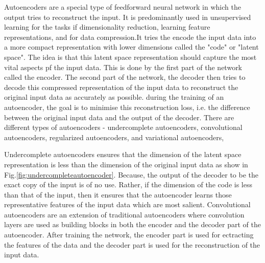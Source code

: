 Autoencoders are a special type of feedforward neural network in which the output tries to reconstruct the input. It is predominantly used in unsupervised learning for the tasks if dimensionality reduction, learning feature representations, and for data compression.It tries the encode the input data into a more compact representation with lower dimensions called the "code"\cite*{Goodfellow-et-al-2016} or "latent space". The idea is that this latent space representation should capture the most vital aspects pf the input data. This is done by the first part of the network called the encoder. The second part of the network, the decoder then tries to decode this compressed representation of the input data to reconstruct the original input data as accurately as possible. during the training of an autoencoder, the goal is to minimise this reconstruction loss, i.e. the difference between the original input data and the output of the decoder. There are different types of autoencoders - undercomplete autoencoders, convolutional autoencoders, regularized autoencoders, and variational autoencoders,

\vspace{5mm}


Undercomplete autoencoders ensures that the dimension of the latent space representation is less than the dimension of the original input data as show in Fig.\ref*{fig:undercompleteautoencoder}. Because, the output of the decoder to be the exact copy of the input is of no use. Rather, if the dimension of the code is less than that of the input, then it ensures that the autoencoder learns those representative features of the input data which are most salient\cite*{Goodfellow-et-al-2016}. Convolutional autoencoders are an extension of traditional autoencoders where convolution layers are used as building blocks in both the encoder and the decoder part of the autoencoder. After training the network, the encoder part is used for ectracting the features of the data and the decoder part is used for the reconstruction of the input data.

\vspace{5mm}

